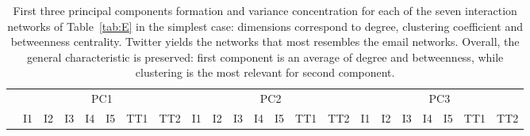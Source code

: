 \documentclass[%
 aip,
 jmp,%
 amsmath,amssymb,
 reprint,%
 floatfix,
]{revtex4-1}
\begin{document}
\begin{table}[!h]
	\caption{First three principal components formation and variance concentration for each of the seven interaction networks of Table~\ref{tab:E} in the simplest case: dimensions correspond to degree, clustering coefficient and betweenness centrality. Twitter yields the networks that most resembles the email networks. Overall, the general characteristic is preserved: first component is an average of degree and betweenness, while clustering is the most relevant for second component.}
	\footnotesize
\begin{center}
\begin{tabular}{| l ||  c |c |c |c |c | c | c || c | c | c | c | c | c | c || c |c |c |c |c | c | c |	}\cline{2-22}
\multicolumn{1}{c|}{} & \multicolumn{7}{c||}{PC1}          & \multicolumn{7}{c||}{PC2} & \multicolumn{7}{c|}{PC3}  \\\cline{2-22}
	\multicolumn{1}{c|}{} & 
	I1 & I2 & I3 & I4 & I5 & TT1 & TT2 &
	I1 & I2 & I3 & I4 & I5 & TT1 & TT2 &
	I1 & I2 & I3 & I4 & I5 & TT1 & TT2 \\\hline
	
\hline
\end{tabular}
\end{center}
\label{tab:pcaE1I}
\end{table}
\end{document}
